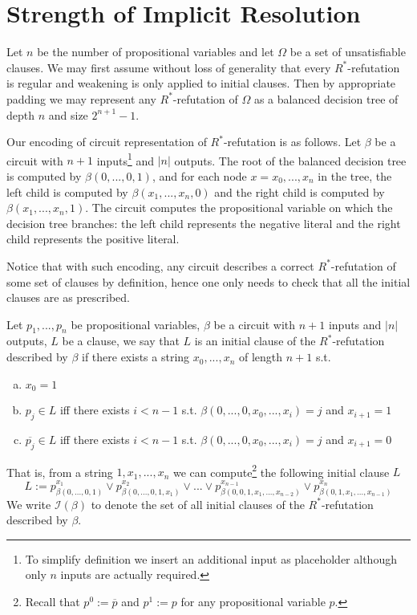 \documentclass{LMCS}
\theoremstyle{plain}\newtheorem{satz}[thm]{Satz}
\begin{document}
\section{Strength of Implicit Resolution}
\label{s_ires}
Let $n$ be the number of propositional variables and let $\Omega$ be a set of unsatisfiable clauses. We may first assume without loss of generality that every $R^*$-refutation is regular and weakening is only applied to initial clauses. Then by appropriate padding we may represent any $R^*$-refutation of $\Omega$ as a balanced decision tree of depth $n$ and size $2^{n+1}-1$.

Our encoding of circuit representation of $R^*$-refutation is as follows. Let $\beta$ be a circuit with $n+1$ inputs\footnote{To simplify definition we insert an additional input as placeholder although only $n$ inputs are actually required.} and $|n|$ outputs. The root of the balanced decision tree is computed by $\beta(0,...,0,1)$, and for each node $x=x_0,...,x_n$ in the tree, the left child is computed by $\beta(x_1,...,x_n,0)$ and the right child is computed by $\beta(x_1,...,x_n,1)$. The circuit computes the propositional variable on which the decision tree branches: the left child represents the negative literal and the right child represents the positive literal.

Notice that with such encoding, any circuit describes a correct $R^*$-refutation of some set of clauses by definition, hence one only needs to check that all the initial clauses are as prescribed.

Let $p_1,...,p_n$ be propositional variables, $\beta$ be a circuit with $n+1$ inputs and $|n|$ outputs, $L$ be a clause, we say that $L$ is an initial clause of the $R^*$-refutation described by $\beta$ if there exists a string $x_0,...,x_n$ of length $n+1$ s.t.
\begin{enumerate}[(a)]
\item
$x_0=1$
\item
$p_j \in L$ iff there exists $i < n-1$ s.t. $\beta(0,...,0,x_0,...,x_i)=j$ and $x_{i+1}=1$
\item
$\overline{p_j} \in L$ iff there exists $i < n-1$ s.t. $\beta(0,...,0,x_0,...,x_i)=j$ and $x_{i+1}=0$
\end{enumerate}
That is, from a string $1,x_1,...,x_n$ we can compute\footnote{Recall that $p^0 := \overline{p}$ and $p^1:=p$ for any propositional variable $p$.} the following initial clause $L$
\begin{equation*}
L := p^{x_1}_{\beta(0,...,0,1)} \lor p^{x_2}_{\beta(0,...,0,1,x_1)} \lor ... \lor p^{x_{n-1}}_{\beta(0,0,1,x_1,...,x_{n-2})} \lor p^{x_n}_{\beta(0,1,x_1,...,x_{n-1})}
\end{equation*}
We write ${\mathcal I}(\beta)$ to denote the set of all initial clauses of the $R^*$-refutation described by $\beta$.
\end{document}
